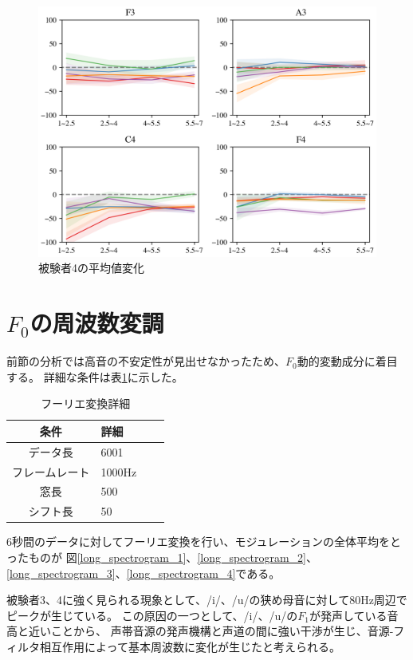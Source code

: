 \documentclass[10ptj,a4j,dvipdfmx,uplatex, oneside, openany]{jsbook}%
\begin{document}
\begin{figure}[htbp]
    \begin{center}
      \includegraphics[clip,width=12.0cm]{long_mean_4.png}
      \caption{被験者4の平均値変化}
      \label{long_mean_4}
    \end{center}
\end{figure}

\section{$F_0$の周波数変調}
前節の分析では高音の不安定性が見出せなかったため、$F_0$動的変動成分に着目する。
詳細な条件は表\ref{table:F0Moduration}に示した。


\begin{table}[h]
    \caption{フーリエ変換詳細}
    \label{table:F0Moduration}
    \centering
    \begin{tabular}{clll}
        \hline
        条件 & 詳細\\
        \hline \hline
        データ長 & 6001\\
        フレームレート & 1000Hz\\
        窓長 & 500\\
        シフト長 & 50\\
        \hline
    \end{tabular}
\end{table}


6秒間のデータに対してフーリエ変換を行い、モジュレーションの全体平均をとったものが
図\ref{long_spectrogram_1}、\ref{long_spectrogram_2}、
\ref{long_spectrogram_3}、\ref{long_spectrogram_4}である。

被験者3、4に強く見られる現象として、/i/、/u/の狭め母音に対して80Hz周辺でピークが生じている。
この原因の一つとして、/i/、/u/の$F_1$が発声している音高と近いことから、
声帯音源の発声機構と声道の間に強い干渉が生じ、音源-フィルタ相互作用によって基本周波数に変化が生じたと考えられる。\cite{source-filterCoupling}
\end{document}
